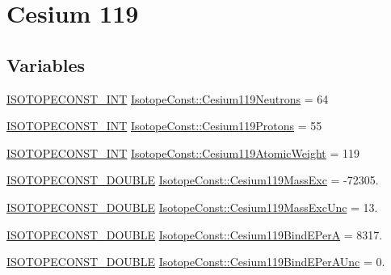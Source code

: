 \hypertarget{group___isotope_const-_cesium-_cs119}{}\section{Cesium 119}
\label{group___isotope_const-_cesium-_cs119}
\subsection*{Variables}
\begin{DoxyCompactItemize}
\item 
\mbox{\hyperlink{group___isotope_const-_macros_ga5f18360b3e99483a35c32d789e62621c}{I\+S\+O\+T\+O\+P\+E\+C\+O\+N\+S\+T\+\_\+\+I\+NT}} \mbox{\hyperlink{group___isotope_const-_cesium-_cs119_ga4315178f4f5034908bdc4c6eabccac40}{Isotope\+Const\+::\+Cesium119\+Neutrons}} = 64
\item 
\mbox{\hyperlink{group___isotope_const-_macros_ga5f18360b3e99483a35c32d789e62621c}{I\+S\+O\+T\+O\+P\+E\+C\+O\+N\+S\+T\+\_\+\+I\+NT}} \mbox{\hyperlink{group___isotope_const-_cesium-_cs119_ga92a37a6b7179eabafb34daec15141c08}{Isotope\+Const\+::\+Cesium119\+Protons}} = 55
\item 
\mbox{\hyperlink{group___isotope_const-_macros_ga5f18360b3e99483a35c32d789e62621c}{I\+S\+O\+T\+O\+P\+E\+C\+O\+N\+S\+T\+\_\+\+I\+NT}} \mbox{\hyperlink{group___isotope_const-_cesium-_cs119_ga0b008ffff6770b6f4bab918c4ec7151a}{Isotope\+Const\+::\+Cesium119\+Atomic\+Weight}} = 119
\item 
\mbox{\hyperlink{group___isotope_const-_macros_ga8f45a7272ce02c0b4c65c44636ed719a}{I\+S\+O\+T\+O\+P\+E\+C\+O\+N\+S\+T\+\_\+\+D\+O\+U\+B\+LE}} \mbox{\hyperlink{group___isotope_const-_cesium-_cs119_ga34ccc67be7c29803c69192d218203caa}{Isotope\+Const\+::\+Cesium119\+Mass\+Exc}} = -\/72305.
\item 
\mbox{\hyperlink{group___isotope_const-_macros_ga8f45a7272ce02c0b4c65c44636ed719a}{I\+S\+O\+T\+O\+P\+E\+C\+O\+N\+S\+T\+\_\+\+D\+O\+U\+B\+LE}} \mbox{\hyperlink{group___isotope_const-_cesium-_cs119_ga27ffd6159245a06fc3e80d9772491071}{Isotope\+Const\+::\+Cesium119\+Mass\+Exc\+Unc}} = 13.
\item 
\mbox{\hyperlink{group___isotope_const-_macros_ga8f45a7272ce02c0b4c65c44636ed719a}{I\+S\+O\+T\+O\+P\+E\+C\+O\+N\+S\+T\+\_\+\+D\+O\+U\+B\+LE}} \mbox{\hyperlink{group___isotope_const-_cesium-_cs119_gad8ed5ede4e3fd767030a13ec33bd7fa0}{Isotope\+Const\+::\+Cesium119\+Bind\+E\+PerA}} = 8317.
\item 
\mbox{\hyperlink{group___isotope_const-_macros_ga8f45a7272ce02c0b4c65c44636ed719a}{I\+S\+O\+T\+O\+P\+E\+C\+O\+N\+S\+T\+\_\+\+D\+O\+U\+B\+LE}} \mbox{\hyperlink{group___isotope_const-_cesium-_cs119_ga3b82bec9c0c79e731acd34179ffb9cda}{Isotope\+Const\+::\+Cesium119\+Bind\+E\+Per\+A\+Unc}} = 0.

\end{DoxyCompactItemize}
